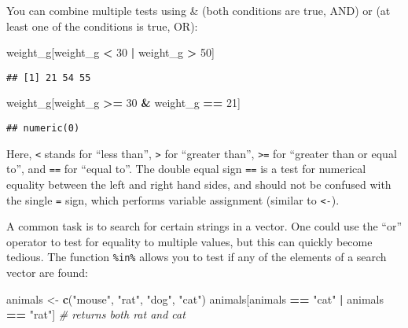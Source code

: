 \documentclass[]{book}
\newenvironment{Shaded}{\begin{snugshade}}{\end{snugshade}}
\newcommand{\KeywordTok}[1]{\textcolor[rgb]{0.13,0.29,0.53}{\textbf{#1}}}
\newcommand{\DecValTok}[1]{\textcolor[rgb]{0.00,0.00,0.81}{#1}}
\newcommand{\StringTok}[1]{\textcolor[rgb]{0.31,0.60,0.02}{#1}}
\newcommand{\CommentTok}[1]{\textcolor[rgb]{0.56,0.35,0.01}{\textit{#1}}}
\newcommand{\OperatorTok}[1]{\textcolor[rgb]{0.81,0.36,0.00}{\textbf{#1}}}
\newcommand{\NormalTok}[1]{#1}
\begin{document}
You can combine multiple tests using \& (both conditions are true, AND)
or \textbar{} (at least one of the conditions is true, OR):

\begin{Shaded}
\begin{Highlighting}[]
\NormalTok{weight_g[weight_g }\OperatorTok{<}\StringTok{ }\DecValTok{30} \OperatorTok{|}\StringTok{ }\NormalTok{weight_g }\OperatorTok{>}\StringTok{ }\DecValTok{50}\NormalTok{]}
\end{Highlighting}
\end{Shaded}

\begin{verbatim}
## [1] 21 54 55
\end{verbatim}

\begin{Shaded}
\begin{Highlighting}[]
\NormalTok{weight_g[weight_g }\OperatorTok{>=}\StringTok{ }\DecValTok{30} \OperatorTok{&}\StringTok{ }\NormalTok{weight_g }\OperatorTok{==}\StringTok{ }\DecValTok{21}\NormalTok{]}
\end{Highlighting}
\end{Shaded}

\begin{verbatim}
## numeric(0)
\end{verbatim}

Here, \texttt{\textless{}} stands for ``less than'',
\texttt{\textgreater{}} for ``greater than'', \texttt{\textgreater{}=}
for ``greater than or equal to'', and \texttt{==} for ``equal to''. The
double equal sign \texttt{==} is a test for numerical equality between
the left and right hand sides, and should not be confused with the
single \texttt{=} sign, which performs variable assignment (similar to
\texttt{\textless{}-}).

A common task is to search for certain strings in a vector. One could
use the ``or'' operator \texttt{\textbar{}} to test for equality to
multiple values, but this can quickly become tedious. The function
\texttt{\%in\%} allows you to test if any of the elements of a search
vector are found:

\begin{Shaded}
\begin{Highlighting}[]
\NormalTok{animals <-}\StringTok{ }\KeywordTok{c}\NormalTok{(}\StringTok{"mouse"}\NormalTok{, }\StringTok{"rat"}\NormalTok{, }\StringTok{"dog"}\NormalTok{, }\StringTok{"cat"}\NormalTok{)}
\NormalTok{animals[animals }\OperatorTok{==}\StringTok{ "cat"} \OperatorTok{|}\StringTok{ }\NormalTok{animals }\OperatorTok{==}\StringTok{ "rat"}\NormalTok{] }\CommentTok{# returns both rat and cat}
\end{Highlighting}
\end{Shaded}
\end{document}
